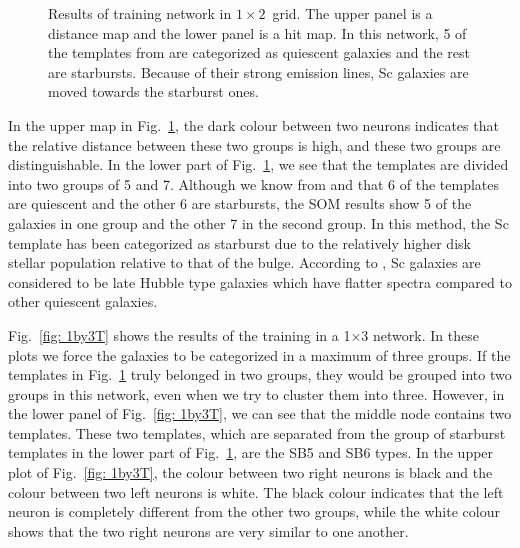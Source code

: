 \begin{figure}
\begin{subfigure}[b]{0.45\textwidth}
                \end{subfigure}
                \caption[Results of training network in $1\times2$~grid]{Results of training network in $1\times2$~grid. The upper panel is a distance map and the lower panel is a hit map. In this network, 5 of the templates from \citet{Kinney96} are categorized as quiescent galaxies and the rest are starbursts. Because of their strong emission lines, Sc galaxies are moved towards the starburst ones.}
                 \label{fig: 1by2T}
            \end{figure}
        
        
            In the upper map in Fig.~\ref{fig: 1by2T}, the dark colour between two neurons indicates that the relative distance between these two groups is high, and these two groups are distinguishable.
            In the lower part of Fig.~\ref{fig: 1by2T}, we see that the templates are divided into two groups of 5 and 7.
            Although we know from  and  that 6 of the templates are quiescent and the other 6 are starbursts, the SOM results show 5 of the galaxies in one group and the other 7 in the second group.
            In this method, the Sc template has been categorized as starburst due to the relatively higher disk stellar population relative to that of the bulge. 
            According to , Sc galaxies are considered to be late Hubble type galaxies which have  flatter spectra compared to other quiescent galaxies. 
            

            Fig.~\ref{fig: 1by3T} shows the results of the training in a 1$\times$3 network.
            In these plots we force the galaxies to be categorized in a maximum of three groups. 
            If the templates in Fig.~\ref{fig: 1by2T} truly belonged in two groups, they would be grouped into two groups in this network, even when we try to cluster them into three. 
            However, in the lower panel of Fig.~\ref{fig: 1by3T}, we can see that the middle node contains two templates.
            These two templates, which are separated from the group of starburst templates in the lower part of Fig.~\ref{fig: 1by2T},  are the SB5 and SB6 types.
            In the upper plot of Fig.~\ref{fig: 1by3T}, the colour between two right neurons is black and the colour between two left neurons is white. 
            The black colour indicates that the left neuron is completely different from the other two groups,
            while the white colour shows that the two right neurons are very similar to one another. 
            
